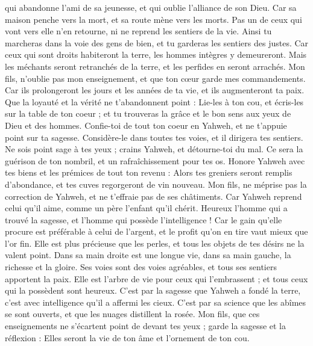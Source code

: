 \begin{multicols}{2}
qui abandonne l’ami de sa jeunesse, et qui oublie l'alliance de son Dieu.
Car sa maison penche vers la mort, et sa route mène vers les morts.
Pas un de ceux qui vont vers elle n'en retourne, ni ne reprend les sentiers de la vie.
Ainsi tu marcheras dans la voie des gens de bien, et tu garderas les sentiers des justes.
Car ceux qui sont droits habiteront  la terre, les hommes intègres y demeureront.
Mais les méchants seront retranchés de la terre, et les perfides en seront arrachés.
\VerseOne{}Mon fils, n’oublie pas mon enseignement, et que ton cœur garde mes commandements.
Car ils prolongeront les jours et les années de ta vie, et ils augmenteront  ta paix\FTNT{}.
Que la loyauté et la vérité ne t'abandonnent point : Lie-les à ton cou, et écris-les sur la table de ton coeur ;
et tu trouveras la grâce et le bon sens aux yeux de Dieu et des hommes.
Confie-toi de tout ton coeur en Yahweh, et ne t'appuie point sur ta sagesse.
Considère-le dans toutes tes voies, et il dirigera tes sentiers.
Ne sois point sage à tes yeux ; crains Yahweh, et détourne-toi du mal.
Ce sera la guérison de ton nombril, et un rafraîchissement pour tes os.
Honore Yahweh avec tes biens et les prémices de tout ton revenu :
Alors tes greniers seront remplis d'abondance, et tes cuves regorgeront de vin nouveau.
Mon fils, ne méprise pas la correction de Yahweh, et ne t’effraie pas de ses châtiments.
Car Yahweh reprend celui qu'il aime, comme un père l'enfant qu’il chérit.
Heureux l’homme qui a trouvé la sagesse, et l'homme qui possède l'intelligence !
Car le gain qu'elle procure est préférable à celui de l'argent, et le profit qu'on en tire vaut mieux que l’or fin.
Elle est plus précieuse que les perles, 	et tous les objets de tes désirs ne la valent point.
Dans sa main droite est une longue vie, dans sa main gauche, la richesse et la gloire.
Ses voies sont des voies agréables, et tous ses sentiers apportent la paix.
Elle est l'arbre de vie pour ceux qui l'embrassent ; et tous ceux qui la possèdent sont heureux.
C’est par la sagesse que Yahweh a fondé la terre, c’est avec intelligence qu’il a affermi les cieux.
C’est par sa science que les abîmes se sont ouverts, et que les nuages distillent la rosée.
Mon fils, que ces enseignements ne s'écartent point de devant tes yeux ; garde la sagesse et la réflexion :
Elles seront la vie de ton âme et l'ornement de ton cou.

\end{multicols}

